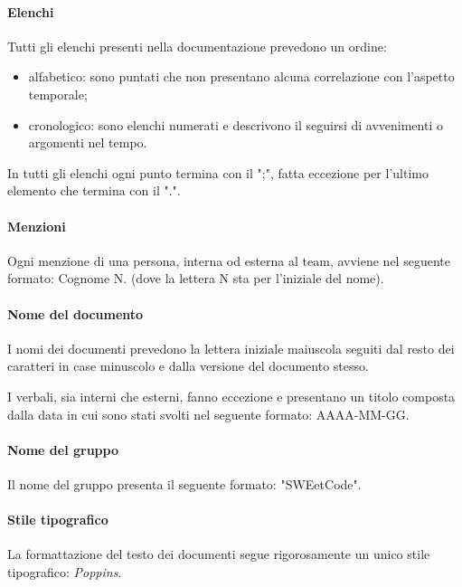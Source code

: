 \documentclass[10pt, a4paper]{article}
\begin{document}
        \paragraph{Elenchi}Tutti gli elenchi presenti nella documentazione prevedono un ordine:
            \begin{itemize}
                \item alfabetico: sono puntati che non presentano alcuna correlazione con l'aspetto temporale;
                \item cronologico: sono elenchi numerati e descrivono il seguirsi di avvenimenti o argomenti nel tempo.
            \end{itemize}
        In tutti gli elenchi ogni punto termina con il ";", fatta eccezione per l'ultimo elemento che termina con il ".".
        
        \paragraph{Menzioni}Ogni menzione di una persona, interna od esterna al team, avviene nel seguente formato: Cognome N. (dove la lettera N sta per l'iniziale del nome).
        
        \paragraph{Nome del documento}I nomi dei documenti prevedono la lettera iniziale maiuscola seguiti dal resto dei caratteri in case minuscolo e dalla versione del documento stesso.

        I verbali, sia interni che esterni, fanno eccezione e presentano un titolo composta dalla data in cui sono stati svolti nel seguente formato: AAAA-MM-GG.
        
        \paragraph{Nome del gruppo}Il nome del gruppo presenta il seguente formato: "SWEetCode".
        
        \paragraph{Stile tipografico}La formattazione del testo dei documenti segue rigorosamente un unico stile tipografico: \textit{Poppins}.
        
\end{document}
